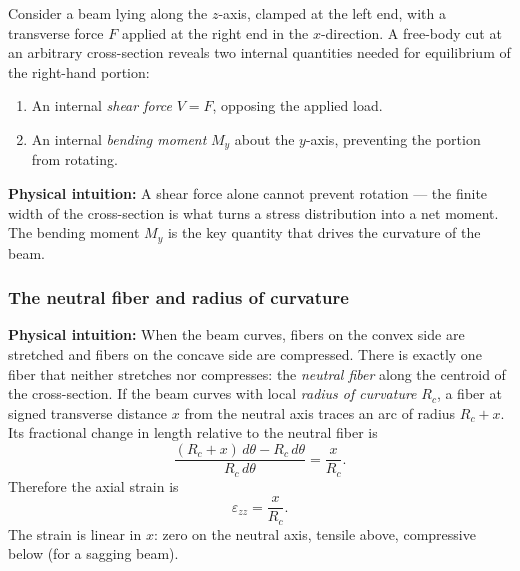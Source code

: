 \documentclass[../main.tex]{subfiles}
\begin{document}
Consider a beam lying along the $z$-axis, clamped at the left end, with a transverse force $F$ applied at the right end in the $x$-direction. A free-body cut at an arbitrary cross-section reveals two internal quantities needed for equilibrium of the right-hand portion:
\begin{enumerate}
    \item An internal \emph{shear force} $V = F$, opposing the applied load.
    \item An internal \emph{bending moment} $M_y$ about the $y$-axis, preventing the portion from rotating.
\end{enumerate}

\noindent\textbf{Physical intuition:} A shear force alone cannot prevent rotation — the finite width of the cross-section is what turns a stress distribution into a net moment. The bending moment $M_y$ is the key quantity that drives the curvature of the beam.

\subsubsection*{The neutral fiber and radius of curvature}

\noindent\textbf{Physical intuition:} When the beam curves, fibers on the convex side are stretched and fibers on the concave side are compressed. There is exactly one fiber that neither stretches nor compresses: the \emph{neutral fiber} along the centroid of the cross-section. If the beam curves with local \emph{radius of curvature} $R_c$, a fiber at signed transverse distance $x$ from the neutral axis traces an arc of radius $R_c + x$. Its fractional change in length relative to the neutral fiber is
\[
    \frac{(R_c + x)\,d\theta - R_c\,d\theta}{R_c\,d\theta} = \frac{x}{R_c}.
\]
Therefore the axial strain is
\begin{equation}
    \boxed{\varepsilon_{zz} = \frac{x}{R_c}.}
    \label{eq:lec08_bending_strain}
\end{equation}
The strain is linear in $x$: zero on the neutral axis, tensile above, compressive below (for a sagging beam).
\end{document}

